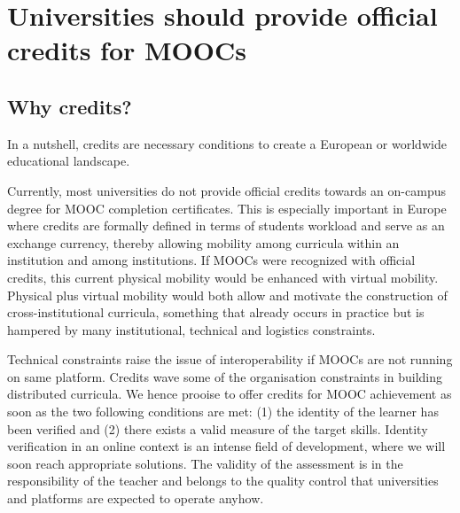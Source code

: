 \section{Universities should provide official credits for MOOCs}
\label{sec:credit}
 

\subsection{Why credits?}

In a nutshell, credits are necessary conditions to create a European or
worldwide educational landscape. 

Currently, most universities do not provide official credits towards an
on-campus degree for MOOC
completion certificates.
This is especially important in Europe where
credits are formally defined in terms of students workload and serve as
an exchange currency, thereby allowing mobility among curricula within an
institution and among institutions. If MOOCs were recognized with official
credits, this current physical mobility would be enhanced with 
virtual mobility.  Physical plus virtual mobility would both allow and motivate
the construction of cross-institutional curricula, something that
already occurs in practice but is hampered by
many institutional, technical and logistics constraints. 


Technical constraints raise the issue of interoperability if MOOCs are not
running on same platform. Credits wave some of the organisation constraints
in building distributed curricula. We hence prooise to offer  credits for 
MOOC achievement as soon as the two following conditions are met: (1) the identity of the
learner has been verified and (2) there exists a valid
measure of the target skills. Identity verification in an online context
is an intense field of development, where we will soon reach appropriate
solutions. The validity of the assessment is in the responsibility of
the teacher and belongs to the quality control that universities and
platforms are expected to operate anyhow.

